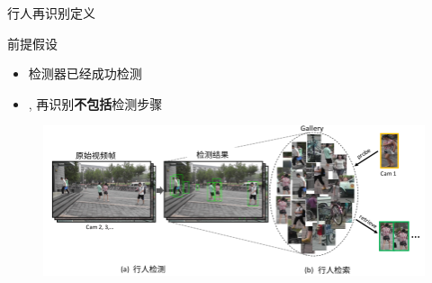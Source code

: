 \documentclass[notes]{beamer}
\begin{document}
\begin{frame}
	{行人再识别定义}
	\begin{block}{前提假设}
		\begin{itemize}
			\item 检测器已经成功检测
			\item \ie, 再识别{\bf 不包括}检测步骤
		\end{itemize}
	\end{block}
	\begin{figure}
		\includegraphics[width=1\linewidth]{background.png}
	\end{figure}
\end{frame}
\end{document}
